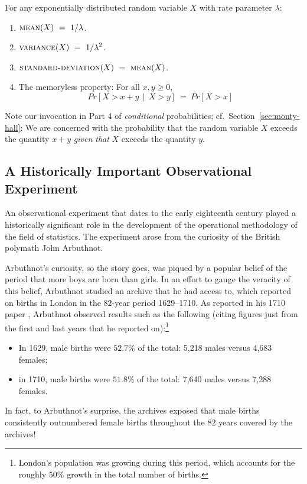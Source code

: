\begin{prop}
\label{thm:exponential-moments}
For any exponentially distributed random variable $X$ with rate parameter $\lambda$:
\begin{enumerate}
\item
$\displaystyle \mbox{\sc mean}(X) \ = \ 1 / \lambda$.

\medskip\item
$\displaystyle \mbox{\sc variance}(X) \ = \ 1 / \lambda^2$.

\medskip\item
$\displaystyle  \mbox{\sc standard-deviation}(X) \ = \  \mbox{\sc mean}(X)$.

\medskip\item
The memoryless property:  For all $x, y \geq 0$,
\[ Pr[X > x+y \ \ | \ \ X > y] \ = \ Pr[X > x] \]
\end{enumerate}
\end{prop}

Note our invocation in Part 4 of {\em conditional} probabilities; cf.~Section~\ref{sec:monty-hall}: We are concerned with the probability that the random variable $X$ exceeds the quantity $x+y$ {\em given that} $X$ exceeds the quantity $y$.


\subsection{A Historically Important Observational Experiment}
\label{sec:Arbuthnot}

An observational experiment that dates to the early eighteenth century played a historically significant role in the development of the operational methodology of the field of statistics.  The experiment arose from the curiosity of the British polymath John Arbuthnot.

\smallskip

Arbuthnot's curiosity, so the story goes, was piqued by a popular belief of the period that more boys are born than girls.  In an effort to gauge the veracity of this belief, Arbuthnot studied an archive that he had access to, which reported on births in London in the $82$-year period 1629--1710.  As reported in his 1710 paper \cite{Arbuthnot}, Arbuthnot observed results such as the following (citing figures just from the first and last years that he reported on):\footnote{London's population was growing during this period, which accounts for the roughly $50\%$ growth in the total number of births.}
\begin{itemize}
\item
In 1629, male births were $52.7\%$ of the total: 5,218 males versus 4,683 females;
\medskip\item
in 1710, male births were $51.8\%$ of the total: 7,640 males versus 7,288 females.
\end{itemize}
In fact, to Arbuthnot's surprise, the archives exposed that male births consistently outnumbered female births throughout the $82$ years covered by the archives!

